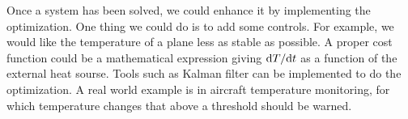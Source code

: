 Once a system has been solved, we could enhance it by implementing the optimization. One thing we could do is to add some controls. For example, we would like the temperature of a plane less as stable as possible. A proper cost function could be a mathematical expression giving $\mathrm d T/\mathrm d t$ as a function of the external heat sourse. Tools such as Kalman filter can be implemented to do the optimization. A real world example is in aircraft temperature monitoring, for which temperature changes that above a threshold should be warned. 


